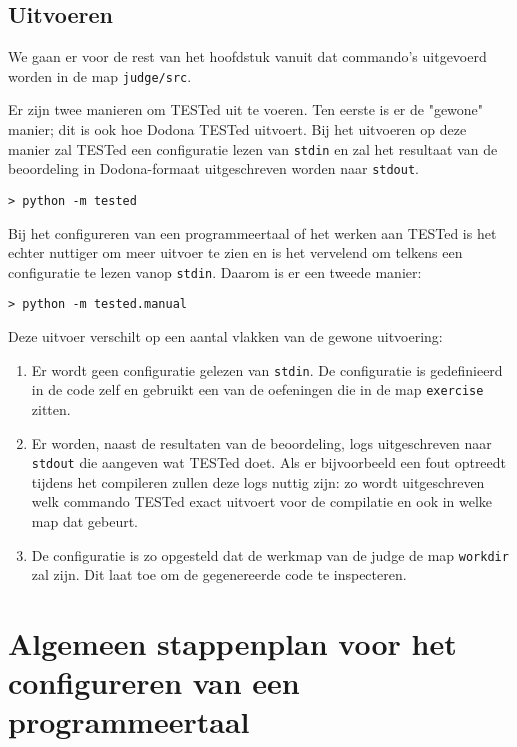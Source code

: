 \subsection{Uitvoeren}\label{subsec:uitvoeren}

We gaan er voor de rest van het hoofdstuk vanuit dat commando's uitgevoerd worden in de map \texttt{judge/src}.

Er zijn twee manieren om TESTed uit te voeren.
Ten eerste is er de "gewone" manier;
dit is ook hoe Dodona TESTed uitvoert.
Bij het uitvoeren op deze manier zal TESTed een configuratie lezen van \texttt{stdin} en zal het resultaat van de beoordeling in Dodona-formaat uitgeschreven worden naar \texttt{stdout}.

\begin{verbatim}
> python -m tested
\end{verbatim}

Bij het configureren van een programmeertaal of het werken aan TESTed is het echter nuttiger om meer uitvoer te zien en is het vervelend om telkens een configuratie te lezen vanop \texttt{stdin}.
Daarom is er een tweede manier:

\begin{verbatim}
> python -m tested.manual
\end{verbatim}

Deze uitvoer verschilt op een aantal vlakken van de gewone uitvoering:

\begin{enumerate}
    \item Er wordt geen configuratie gelezen van \texttt{stdin}.
    De configuratie is gedefinieerd in de code zelf en gebruikt een van de oefeningen die in de map \texttt{exercise} zitten.
    \item Er worden, naast de resultaten van de beoordeling, logs uitgeschreven naar \texttt{stdout} die aangeven wat TESTed doet.
    Als er bijvoorbeeld een fout optreedt tijdens het compileren zullen deze logs nuttig zijn: zo wordt uitgeschreven welk commando TESTed exact uitvoert voor de compilatie en ook in welke map dat gebeurt.
    \item De configuratie is zo opgesteld dat de werkmap van de judge de map \texttt{workdir} zal zijn.
    Dit laat toe om de gegenereerde code te inspecteren.
\end{enumerate}

\section{Algemeen stappenplan voor het configureren van een programmeertaal}\label{sec:algemeen-stappenplan-voor-het-configureren}

